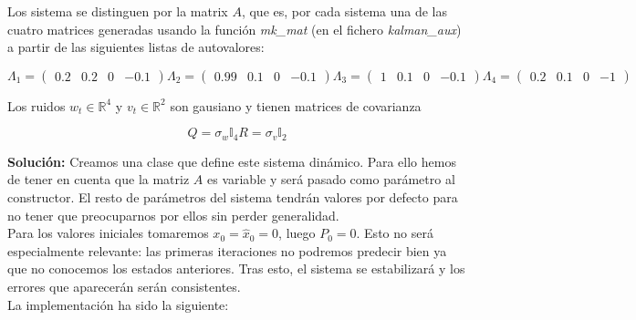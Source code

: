 \documentclass[a4paper]{article}
\newcommand{\R}{\mathbb{R}}
\newcommand{\I}{\mathbb{I}}
\begin{document}
Los sistema se distinguen por la matrix $A$, que es, por cada sistema una de las cuatro matrices generadas usando la función \emph{mk\_mat} (en el fichero \emph{kalman\_aux}) a partir de las siguientes listas de autovalores:

\[
	\Lambda_1 = \begin{pmatrix} 0.2 & 0.2 & 0 & -0.1 \end{pmatrix}
	\Lambda_2 = \begin{pmatrix} 0.99 & 0.1 & 0 & -0.1 \end{pmatrix}
	\Lambda_3 = \begin{pmatrix} 1 & 0.1 & 0 & -0.1 \end{pmatrix}
	\Lambda_4 = \begin{pmatrix} 0.2 & 0.1 & 0 & -1 \end{pmatrix}
\]

Los ruidos $w_t \in \R^4$ y $v_t \in \R^2$ son gausiano y tienen matrices de covarianza

\[
	Q = \sigma_w \I_4
	R = \sigma_v \I_2
\]

\textbf{Solución:} Creamos una clase que define este sistema dinámico. Para ello hemos de tener en cuenta que la matriz $A$ es variable y será pasado como parámetro al constructor. El resto de parámetros del sistema tendrán valores por defecto para no tener que preocuparnos por ellos sin perder generalidad. \\

Para los valores iniciales tomaremos $x_0 = \hat x_0 = 0$, luego $P_0 = 0$. Esto no será especialmente relevante: las primeras iteraciones no podremos predecir bien ya que no conocemos los estados anteriores. Tras esto, el sistema se estabilizará y los errores que aparecerán serán consistentes. \\

La implementación ha sido la siguiente:
\end{document}
